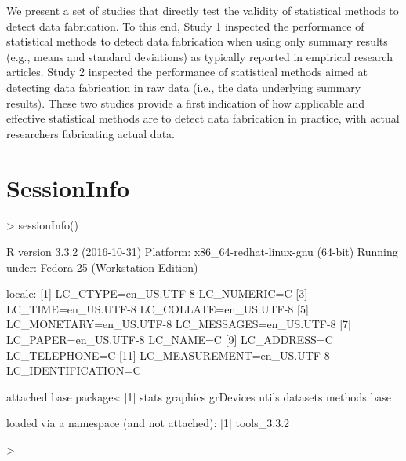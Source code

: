 \documentclass{article}
\begin{document}
We present a set of studies that directly test the validity of statistical methods to detect data fabrication. To this end, Study 1 inspected the performance of statistical methods to detect data fabrication when using only summary results (e.g., means and standard deviations) as typically reported in empirical research articles. Study 2 inspected the performance of statistical methods aimed at detecting data fabrication in raw data (i.e., the data underlying summary results). These two studies provide a first indication of how applicable and effective statistical methods are to detect data fabrication in practice, with actual researchers fabricating actual data.



\newpage
\section*{SessionInfo}

\begin{Schunk}
\begin{Sinput}
> sessionInfo()
\end{Sinput}
\begin{Soutput}
R version 3.3.2 (2016-10-31)
Platform: x86_64-redhat-linux-gnu (64-bit)
Running under: Fedora 25 (Workstation Edition)

locale:
 [1] LC_CTYPE=en_US.UTF-8       LC_NUMERIC=C              
 [3] LC_TIME=en_US.UTF-8        LC_COLLATE=en_US.UTF-8    
 [5] LC_MONETARY=en_US.UTF-8    LC_MESSAGES=en_US.UTF-8   
 [7] LC_PAPER=en_US.UTF-8       LC_NAME=C                 
 [9] LC_ADDRESS=C               LC_TELEPHONE=C            
[11] LC_MEASUREMENT=en_US.UTF-8 LC_IDENTIFICATION=C       

attached base packages:
[1] stats     graphics  grDevices utils     datasets  methods   base     

loaded via a namespace (and not attached):
[1] tools_3.3.2
\end{Soutput}
\begin{Sinput}
> 
\end{Sinput}
\end{Schunk}
\end{document}
